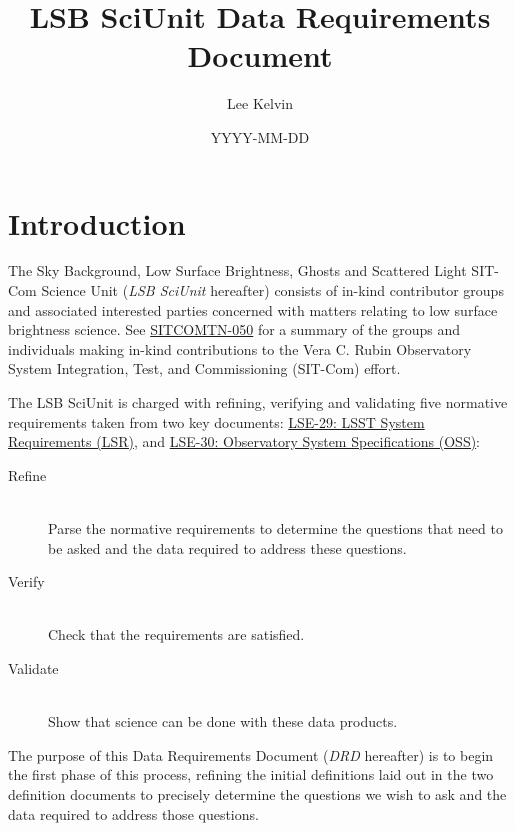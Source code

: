 \documentclass[SE,authoryear,toc]{lsstdoc}
\title{LSB SciUnit Data Requirements Document}
\author{%
Lee Kelvin
}
\date{YYYY-MM-DD}
\begin{document}
\maketitle


\section{Introduction}  \label{sec:introduction}

The Sky Background, Low Surface Brightness, Ghosts and Scattered Light SIT-Com Science Unit (\textit{LSB SciUnit} hereafter) consists of in-kind contributor groups and associated interested parties concerned with matters relating to low surface brightness science. See \href{https://sitcomtn-050.lsst.io/}{SITCOMTN-050} for a summary of the groups and individuals making in-kind contributions to the Vera C. Rubin Observatory System Integration, Test, and Commissioning (SIT-Com) effort.

The LSB SciUnit is charged with refining, verifying and validating five normative requirements taken from two key documents: \href{https://docushare.lsst.org/docushare/dsweb/Get/LSE-29}{LSE-29: LSST System Requirements (LSR)}, and \href{https://docushare.lsst.org/docushare/dsweb/Get/LSE-30}{LSE-30: Observatory System Specifications (OSS)}:
\begin{description}
  \item[Refine] \hfill \\ Parse the normative requirements to determine the questions that need to be asked and the data required to address these questions.
  \item[Verify] \hfill \\ Check that the requirements are satisfied.
  \item[Validate] \hfill \\ Show that science can be done with these data products.
\end{description}

The purpose of this Data Requirements Document (\textit{DRD} hereafter) is to begin the first phase of this process, refining the initial definitions laid out in the two definition documents to precisely determine the questions we wish to ask and the data required to address those questions.
\end{document}
